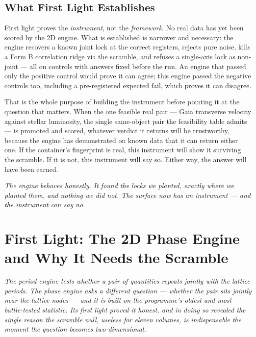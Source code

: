 \documentclass[11pt, letterpaper, openany]{book}
\begin{document}
\section{What First Light Establishes}

\begin{warningbox}
First light proves the \emph{instrument}, not the \emph{framework}. No real data has yet been scored
by the 2D engine. What is established is narrower and necessary: the engine recovers a known joint
lock at the correct registers, rejects pure noise, kills a Form B correlation ridge via the scramble,
and refuses a single-axis lock as non-joint --- all on controls with answers fixed before the run.
An engine that passed only the positive control would prove it can agree; this engine passed the
negative controls too, including a pre-registered expected fail, which proves it can disagree.
\end{warningbox}

That is the whole purpose of building the instrument before pointing it at the question that matters.
When the one feasible real pair --- Gaia transverse velocity against stellar luminosity, the single
same-object pair the feasibility table admits --- is promoted and scored, whatever verdict it returns
will be trustworthy, because the engine has demonstrated on known data that it can return either one.
If the container's fingerprint is real, this instrument will show it surviving the scramble. If it is
not, this instrument will say so. Either way, the answer will have been earned.

\begin{center}
\vspace{0.5em}
\itshape
The engine behaves honestly. It found the locks we planted, exactly where we planted them, and
nothing we did not. The surface now has an instrument --- and the instrument can say no.
\vspace{0.5em}
\end{center}


\chapter{First Light: The 2D Phase Engine and Why It Needs the Scramble}

\begin{center}
\textit{The period engine tests whether a pair of quantities repeats jointly with the lattice
periods. The phase engine asks a different question --- whether the pair sits jointly near the
lattice nodes --- and it is built on the programme's oldest and most battle-tested statistic. Its
first light proved it honest, and in doing so revealed the single reason the scramble null, useless
for eleven volumes, is indispensable the moment the question becomes two-dimensional.}
\end{center}
\end{document}
